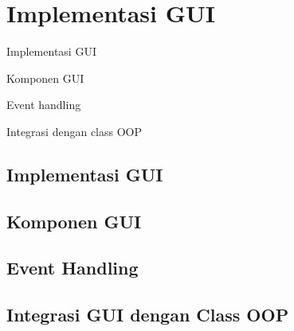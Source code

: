 \chapter{Implementasi GUI}

\begin{dibabini}
  \item Implementasi GUI
  \item Komponen GUI
  \item Event handling
  \item Integrasi dengan class OOP
\end{dibabini}

\section{Implementasi GUI}

\section{Komponen GUI}

\section{Event Handling}

\section{Integrasi GUI dengan Class OOP}
